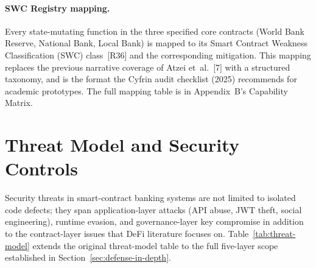\documentclass[12pt,a4paper]{report}
\begin{document}
\paragraph{SWC Registry mapping.}
Every state-mutating function in the three specified core contracts (World Bank Reserve, National Bank, Local Bank) is mapped to its Smart Contract Weakness Classification (SWC) class~[R36] and the corresponding mitigation. This mapping replaces the previous narrative coverage of Atzei et~al.~[7] with a structured taxonomy, and is the format the Cyfrin audit checklist (2025) recommends for academic prototypes. The full mapping table is in Appendix~B's Capability Matrix.

\section{Threat Model and Security Controls}
\label{sec:threat-model}

Security threats in smart-contract banking systems are not limited to isolated code defects; they span application-layer attacks (API abuse, JWT theft, social engineering), runtime evasion, and governance-layer key compromise in addition to the contract-layer issues that DeFi literature focuses on. Table~\ref{tab:threat-model} extends the original threat-model table to the full five-layer scope established in Section~\ref{sec:defense-in-depth}.
\end{document}
